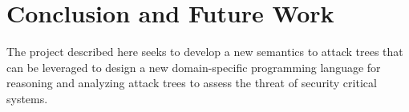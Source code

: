 \documentclass{llncs}
\begin{document}


\section{Conclusion and Future Work}
\label{sec:conclusion}

The project described here seeks to develop a new semantics to attack
trees that can be leveraged to design a new domain-specific
programming language for reasoning and analyzing attack trees to assess
the threat of security critical systems.
\end{document}
